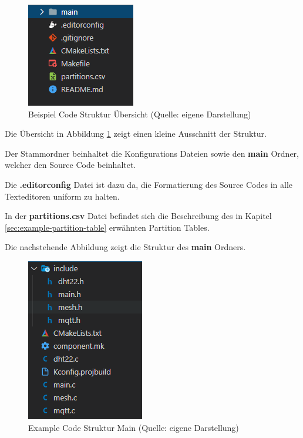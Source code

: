 \begin{figure}[H]
    \begin{center}
        \includegraphics[scale=0.8]{images/example_code_structure_overview.png}
        \caption{Beispiel Code Struktur Übersicht (Quelle: eigene Darstellung)}
        \label{abb:example_code_structure_overview}
    \end{center}
\end{figure}

Die Übersicht in Abbildung \ref{abb:example_code_structure_overview} zeigt einen kleine Ausschnitt der Struktur.

Der Stammordner beinhaltet die Konfigurations Dateien sowie den \textbf{main} Ordner, welcher den Source Code beinhaltet.

Die \textbf{.editorconfig} Datei ist dazu da, die Formatierung des Source Codes in alle Texteditoren uniform zu halten.

In der \textbf{partitions.csv} Datei befindet sich die Beschreibung des in Kapitel \ref{sec:example-partition-table} erwähnten Partition Tables.

Die nachstehende Abbildung zeigt die Struktur des \textbf{main} Ordners.

\begin{figure}[H]
    \begin{center}
        \includegraphics[scale=0.8]{images/example_code_structure_main.png}
        \caption{Example Code Struktur Main (Quelle: eigene Darstellung)}
        \label{abb:example_code_structure_main}
    \end{center}
\end{figure}


